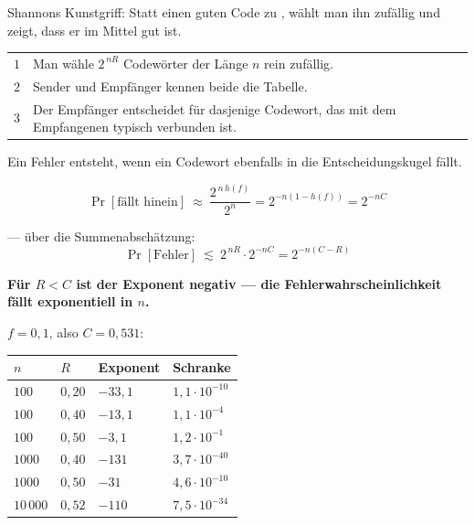 \begin{merksatz}
Shannons Kunstgriff: Statt einen guten Code zu , wählt man ihn zufällig und zeigt, dass er im Mittel gut ist.

\begin{center}
\renewcommand{\arraystretch}{1.5}
\begin{tabular}{@{}P{1.0cm}P{7.4cm}@{}}
\toprule
$1$ & Man wähle $2^{\,nR}$ Codewörter der Länge $n$ rein zufällig.\\
$2$ & Sender und Empfänger kennen beide die Tabelle.\\
$3$ & Der Empfänger entscheidet für dasjenige Codewort, das mit dem Empfangenen typisch verbunden ist.\\
\bottomrule
\end{tabular}
\end{center}

Ein Fehler entsteht, wenn ein  Codewort ebenfalls in die Entscheidungskugel fällt.

\[ \Pr[\text{fällt hinein}] \ \approx\ \frac{2^{\,n\,h(f)}}{2^{n}} = 2^{-n(1-h(f))} = 2^{-nC} \]

 --- über die Summenabschätzung:
\[ \Pr[\text{Fehler}] \ \lesssim\ 2^{\,nR}\cdot 2^{-nC} = 2^{-n(C-R)} \]

\begin{center}
\begin{minipage}{0.9\textwidth}
\textbf{Für $R < C$ ist der Exponent negativ --- die Fehlerwahrscheinlichkeit fällt exponentiell in $n$.}
\end{minipage}
\end{center}

$f = 0{,}1$, also $C = 0{,}531$:
\begin{center}
{\small
\renewcommand{\arraystretch}{1.48}
\begin{tabular}{@{}P{1.6cm}P{1.4cm}P{2.0cm}P{2.2cm}@{}}
\toprule
$n$ & $R$ & \textbf{Exponent} & \textbf{Schranke}\\
\midrule
$100$ & $0{,}20$ & $-33{,}1$ & $1{,}1\cdot10^{-10}$\\
$100$ & $0{,}40$ & $-13{,}1$ & $1{,}1\cdot10^{-4}$\\
$100$ & $0{,}50$ & $-3{,}1$ & $1{,}2\cdot10^{-1}$\\
$1000$ & $0{,}40$ & $-131$ & $3{,}7\cdot10^{-40}$\\
$1000$ & $0{,}50$ & $-31$ & $4{,}6\cdot10^{-10}$\\
$10\,000$ & $0{,}52$ & $-110$ & $7{,}5\cdot10^{-34}$\\
\bottomrule
\end{tabular}}
\end{center}


\end{merksatz}
